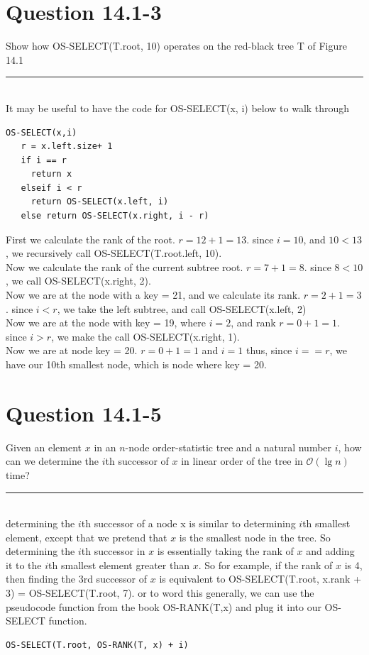 \documentclass[20pt]{article} %
\begin{document}
\section{Question 14.1-3}
Show how OS-SELECT(T.root, 10) operates on the red-black tree T of Figure 14.1 \\
\noindent\rule{2cm}{0.4pt} \\

It may be useful to have the code for OS-SELECT(x, i) below to walk through 
\begin{verbatim}
OS-SELECT(x,i)
   r = x.left.size+ 1
   if i == r
     return x
   elseif i < r
     return OS-SELECT(x.left, i)
   else return OS-SELECT(x.right, i - r)
\end{verbatim} 

First we calculate the rank of the root. $r = 12 + 1 = 13$. since $i = 10$, and $10 < 13$, we recursively call OS-SELECT(T.root.left, 10). \\
Now we calculate the rank of the current subtree root. $r = 7 + 1 = 8$. since $8 < 10$, we call OS-SELECT(x.right, 2). \\
Now we are at the node with a key =  21, and we calculate its rank. $r = 2 + 1 = 3$. since $i < r$, we take the left subtree, and call OS-SELECT(x.left, 2) \\
Now we are at the node with key = 19, where $i = 2$, and rank $r = 0 + 1 = 1$.  since $i > r$, we make the call OS-SELECT(x.right, 1). \\
Now we are at node key = 20.  $r = 0 + 1 = 1$ and $i = 1$ thus, since $i == r$, we have our 10th smallest node, which is node where key = 20.

\section{Question 14.1-5}
Given an element $x$ in an $n$-node order-statistic tree and a natural number $i$, how can we determine the $i$th successor of $x$ in linear order of the tree in $\mathcal{O}(\lg n)$ time? \\
\noindent\rule{2cm}{0.4pt} \\

determining the $i$th successor of a node x is similar to determining $i$th smallest element, except that we pretend that $x$ is the smallest node in the tree.  So determining the $i$th successor in $x$ is essentially taking the rank of $x$ and adding it to the $i$th smallest element greater than $x$.  So for example, if the rank of $x$ is 4, then finding the 3rd successor of $x$ is equivalent to OS-SELECT(T.root, x.rank + 3) = OS-SELECT(T.root, 7). or to word this generally, we can use the pseudocode function from the book OS-RANK(T,x) and plug it into our OS-SELECT function.
\begin{verbatim}
OS-SELECT(T.root, OS-RANK(T, x) + i)
\end{verbatim}
\end{document}
